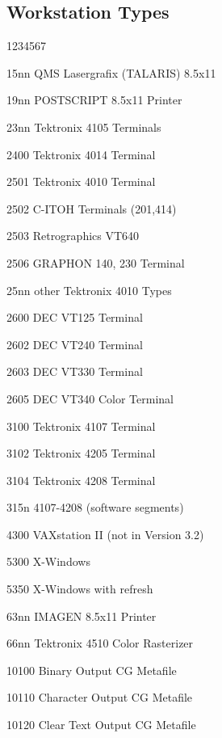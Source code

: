 \subsection{\ATCGKS{} Workstation Types}
\begin{DLtt}{1234567}
\item[15nn]  QMS Lasergrafix (TALARIS) 8.5x11
\item[19nn]  POSTSCRIPT 8.5x11 Printer
\item[23nn]  Tektronix 4105 Terminals
\item[2400]  Tektronix 4014 Terminal
\item[2501]  Tektronix 4010 Terminal
\item[2502]  C-ITOH Terminals (201,414)
\item[2503]  Retrographics VT640
\item[2506]  GRAPHON 140, 230 Terminal
\item[25nn]  other Tektronix 4010 Types
\item[2600]  DEC VT125 Terminal
\item[2602]  DEC VT240 Terminal
\item[2603]  DEC VT330 Terminal
\item[2605]  DEC VT340 Color Terminal
\item[3100]  Tektronix 4107 Terminal
\item[3102]  Tektronix 4205 Terminal
\item[3104]  Tektronix 4208 Terminal
\item[315n]  4107-4208 (software segments)
\item[4300]  VAXstation II (not in Version 3.2)
\item[5300]  X-Windows
\item[5350]  X-Windows with refresh
\item[63nn]  IMAGEN 8.5x11 Printer
\item[66nn]  Tektronix 4510 Color Rasterizer
\item[10100]  Binary Output CG Metafile
\item[10110]  Character Output CG Metafile
\item[10120]  Clear Text Output CG Metafile
\end{DLtt}

